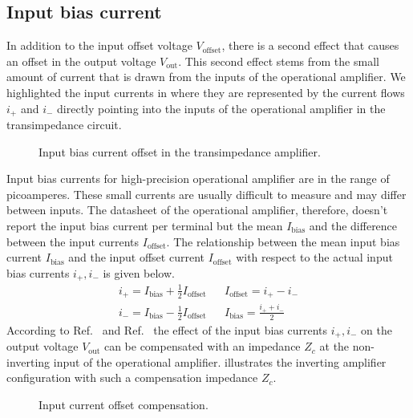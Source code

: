 \subsection{Input bias current}

In addition to the input offset voltage $V_\text{offset}$, there is a second effect that causes an offset in the output voltage $V_\text{out}$.
This second effect stems from the small amount of current that is drawn from the inputs of the operational amplifier.
We highlighted the input currents in  where they are represented by the current flows $i_+$ and $i_-$ directly pointing into the inputs of the operational amplifier in the transimpedance circuit.
\begin{figure}[H]
	\centering
	
	\caption{Input bias current offset in the transimpedance amplifier.}\label{fig:input_bias_current}
\end{figure}
Input bias currents for high-precision operational amplifier are in the range of picoamperes.
These small currents are usually difficult to measure and may differ between inputs.
The datasheet of the operational amplifier, therefore, doesn't report the input bias current per terminal but the mean $I_\text{bias}$ and the difference between the input currents $I_\text{offset}$.
The relationship between the mean input bias current $I_\text{bias}$ and the input offset current $I_\text{offset}$ with respect to the actual input bias currents $i_+,i_-$ is given below.
\begin{align}
	i_+=I_\text{bias}+\frac{1}{2}I_\text{offset} &&
	I_\text{offset}=i_+-i_- \\
	i_-=I_\text{bias}-\frac{1}{2}I_\text{offset} &&
	I_\text{bias}=\frac{i_++i_-}{2}
\end{align}
According to Ref.~\cite[p.~57]{Jung05} and Ref.~\cite[p.~25]{Graeme96} the effect of the input bias currents $i_+,i_-$ on the output voltage $V_\text{out}$ can be compensated with an impedance $Z_c$ at the non-inverting input of the operational amplifier.
 illustrates the inverting amplifier configuration with such a compensation impedance $Z_c$.
\begin{figure}[H]
	\centering
	
	\caption{Input current offset compensation.}\label{fig:input_bias_current_compensation}
\end{figure}
